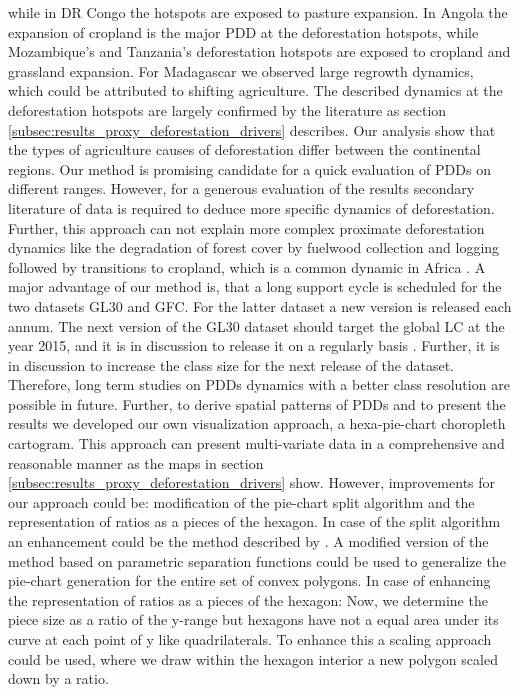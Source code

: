 while in DR Congo the hotspots are exposed to pasture expansion. In Angola the expansion of cropland is the major \ac{PDD} at the deforestation hotspots, while Mozambique's and Tanzania's deforestation hotspots are exposed to cropland and grassland expansion. For Madagascar we observed large regrowth dynamics, which could be attributed to shifting agriculture. The described dynamics at the deforestation hotspots are largely confirmed by the literature as section \ref{subsec:results_proxy_deforestation_drivers} describes. Our analysis show that the types of agriculture causes of deforestation differ between the continental regions. Our method is promising candidate for a quick evaluation of \acp{PDD} on different ranges. However, for a generous evaluation of the results secondary literature of data is required to deduce more specific dynamics of deforestation. Further, this approach can not explain more complex proximate deforestation dynamics like the degradation of forest cover by fuelwood collection and logging followed by transitions to cropland, which is a common dynamic in Africa \citep{Geist2001,Cabral2011}. A major advantage of our method is, that a long support cycle is scheduled for the two datasets \ac{GL30} and \ac{GFC}. For the latter dataset a new version is released each annum. The next version of the \ac{GL30} dataset should target the global \ac{LC} at the year 2015, and it is in discussion to release it on a regularly basis \citep{Chen2017}. Further, it is in discussion to increase the class size for the next release of the dataset. Therefore, long term studies on \acp{PDD} dynamics with a better class resolution are possible in future. Further, to derive spatial patterns of \acp{PDD} and to present the results we developed our own visualization approach, a hexa-pie-chart choropleth cartogram. This approach can present multi-variate data in a comprehensive and reasonable manner as the maps in section \ref{subsec:results_proxy_deforestation_drivers} show. However, improvements for our approach could be: modification of the pie-chart split algorithm and the representation of ratios as a pieces of the hexagon. In case of the split algorithm an enhancement could be the method described by \citet{Skala1994}. A modified version of the method based on parametric separation functions could be used to generalize the pie-chart generation for the entire set of convex polygons. In case of enhancing the representation of ratios as a pieces of the hexagon: Now, we determine the piece size as a ratio of the y-range but hexagons have not a equal area under its curve at each point of y like quadrilaterals. To enhance this a scaling approach could be used, where we draw within the hexagon interior a new polygon scaled down by a ratio.

